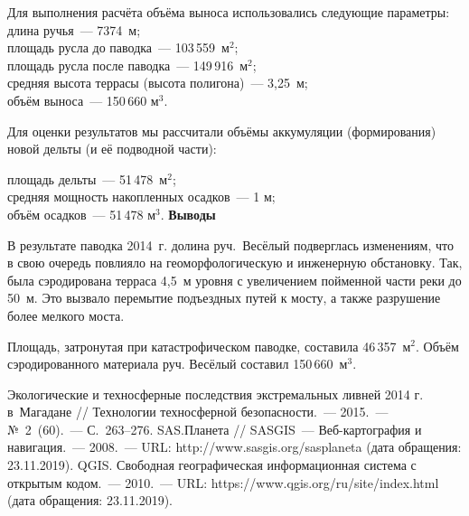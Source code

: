 Для выполнения расчёта объёма выноса использовались следующие параметры:\\
длина ручья~--- 7374 м;\\
площадь русла до паводка~--- 103\,559~м$^2$;\\
площадь русла после паводка~--- 149\,916~м$^2$;\\
средняя высота террасы (высота полигона)~--- 3,25~м;\\
объём выноса~--- 150\,660 м$^3$.

Для оценки результатов мы рассчитали объёмы аккумуляции (формирования) новой дельты (и её подводной части):
	\enlargethispage{\baselineskip}

\hspace{-0.5cm}площадь дельты~--- 51\,478~м$^2$;\\
средняя мощность накопленных осадков~--- 1 м;\\
объём осадков~--- 51\,478 м$^3$.
\clearpage
\textbf{Выводы}

В результате паводка 2014~г. долина руч.~Весёлый подверглась изменениям, что в свою очередь повлияло на геоморфологическую и инженерную обстановку. Так, была сэродирована терраса 4,5~м уровня с увеличением пойменной части реки до 50~м. Это вызвало перемытие подъездных путей к мосту, а также разрушение более мелкого моста.

Площадь, затронутая при катастрофическом паводке, составила 46\,357~м$^2$. Объём сэродированного материала руч. Весёлый составил 150\,660~м$^3$.


\begin{thebibliography}{99}

\bibitem{} Экологические и техносферные последствия экстремальных ливней 2014 г. в~Магадане // Технологии техносферной безопасности.~--- 2015.~--- №~2~(60).~--- С.~263--276.
\bibitem{}SAS.Планета // SASGIS~--- Веб-картография и навигация.~--- 2008.~--- URL: http://www.sasgis.org/sasplaneta (дата обращения: 23.11.2019).
\bibitem{}QGIS. Свободная географическая информационная система с открытым кодом.~--- 2010.~--- URL: https://www.qgis.org/ru/site/index.html (дата обращения: 23.11.2019).
    \end{thebibliography}
